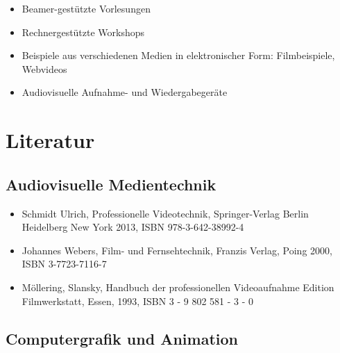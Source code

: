 \begin{itemize}
\tightlist
\item
  Beamer-gestützte Vorlesungen
\item
  Rechnergestützte Workshops
\item
  Beispiele aus verschiedenen Medien in elektronischer Form:
  Filmbeispiele, Webvideos
\item
  Audiovisuelle Aufnahme- und Wiedergabegeräte
\end{itemize}

\section*{Literatur\label{/mi-2017/modulbeschreibungen-bachelor/BA_Vertiefung-Visual-Computing}}\label{literaturpathlabelmi-2017modulbeschreibungen-bachelorbaux5fvertiefung-visual-computing}

\subsection*{Audiovisuelle
Medientechnik\label{/mi-2017/modulbeschreibungen-bachelor/BA_Vertiefung-Visual-Computing}}\label{audiovisuelle-medientechnikpathlabelmi-2017modulbeschreibungen-bachelorbaux5fvertiefung-visual-computing-4}

\begin{itemize}
\tightlist
\item
  Schmidt Ulrich, Professionelle Videotechnik, Springer-Verlag Berlin
  Heidelberg New York 2013, ISBN 978-3-642-38992-4
\item
  Johannes Webers, Film- und Fernsehtechnik, Franzis Verlag, Poing 2000,
  ISBN 3-7723-7116-7
\item
  Möllering, Slansky, Handbuch der professionellen Videoaufnahme Edition
  Filmwerkstatt, Essen, 1993, ISBN 3 - 9 802 581 - 3 - 0
\end{itemize}

\subsection*{Computergrafik und
Animation\label{/mi-2017/modulbeschreibungen-bachelor/BA_Vertiefung-Visual-Computing}}\label{computergrafik-und-animationpathlabelmi-2017modulbeschreibungen-bachelorbaux5fvertiefung-visual-computing-4}

